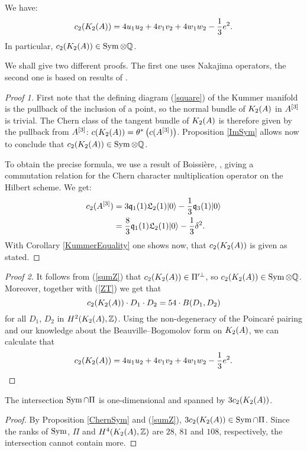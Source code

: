 \begin{proposition} \label{ChernSym}
We have:
\begin{equation}
c_2(K_{ 2 }( A ))= 4 u_1u_2 + 4v_1v_2 + 4 w_1 w_2 - \frac{1}{3} e^2. 
\end{equation}
In particular, $c_2(K_{ 2 }( A ))\in \operatorname{Sym} \otimes\mathbb{Q} $.
\end{proposition}
We shall give two different proofs. The first one uses Nakajima operators, the second one is based on results of \cite{Hassett}.
\begin{proof}[Proof 1]
First note that the defining diagram (\ref{square}) of the Kummer manifold is the pullback of the inclusion of a point, so the normal bundle of $K_{ 2 }( A )$ in $A^{[3]}$ is trivial. The Chern class of the tangent bundle of $K_{ 2 }( A )$ is therefore given by the pullback from $A^{[3]}$: $c(K_{ 2 }( A )) = \theta^*\left(c(A^{[3]})\right)$. Proposition \ref{ImSym} allows now to conclude that $c_2(K_{ 2 }( A ))\in \operatorname{Sym} \otimes \mathbb{Q}$.

To obtain the precise formula, we use a result of Boissi\`ere, \cite[Lemma 3.12]{Boissiere}, giving a commutation relation for the Chern character multiplication operator on the Hilbert scheme. We get:
\begin{align*}
c_2(A^{[3]}) & = 3\mathfrak{q}_1(1)\mathfrak L_2(1)|0\rangle - \frac{1}{3} \mathfrak{q}_3(1)|0\rangle \\
 & =\frac{8}{3}\mathfrak{q}_1(1)\mathfrak L_2(1)|0\rangle - \frac{1}{3} \delta^2 .
\end{align*}
With Corollary \ref{KummerEquality} one shows now, that $c_2(K_{ 2 }( A ))$ is given as stated.
\end{proof}
\begin{proof}[Proof 2]
It follows from (\ref{sumZ}) that $c_2(K_{ 2 }( A ))\in \Pi'^\perp$, so $c_2(K_{ 2 }( A )) \in \operatorname{Sym}\otimes\mathbb{Q}$. Moreover, together with (\ref{ZT}) we get that
\begin{equation*}
c_2(K_{ 2 }( A ))\cdot D_{1}\cdot D_{2}=54\cdot B(D_{1},D_{2})
\end{equation*}
for all $D_{1}$, $D_{2}$ in $H^{2}(K_{ 2 }( A ),\mathbb{Z})$. Using the non-degeneracy of the Poincar\'e pairing and our knowledge about the Beauville--Bogomolov form on $K_{ 2 }( A )$, we can calculate that
$$
c_2(K_{ 2 }( A ))= 4 u_1u_2 + 4v_1v_2 + 4 w_1 w_2 - \frac{1}{3} e^2.  \qedhere
$$
\end{proof}


\begin{corollary}\label{Pi'}
The intersection $\operatorname{Sym}\cap \Pi$ is one-dimensional and spanned by $3c_2(K_{ 2 }( A ))$. 
\end{corollary}
\begin{proof}
By Proposition \ref{ChernSym} and (\ref{sumZ}), $3c_2(K_{ 2 }( A ))\in \operatorname{Sym}\cap \Pi$. Since the ranks of $\operatorname{Sym}$, $\Pi$ and $H^4(K_{ 2 }( A ),\mathbb{Z})$ are $28$, $81$ and $108$, respectively, the intersection cannot contain more.
\end{proof}

